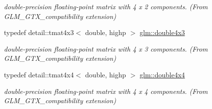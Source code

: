 \begin{CompactItemize}
\begin{CompactList}\small\item\em double-precision floating-point matrix with 4 x 2 components. (From GLM\_\-GTX\_\-compatibility extension) \item\end{CompactList}\item 
\hypertarget{group__gtx__compatibility_g1199ee41226db53d5f190d0628041845}{
typedef detail::tmat4x3$<$ double, highp $>$ \hyperlink{group__gtx__compatibility_g1199ee41226db53d5f190d0628041845}{glm::double4x3}}
\label{group__gtx__compatibility_g1199ee41226db53d5f190d0628041845}

\begin{CompactList}\small\item\em double-precision floating-point matrix with 4 x 3 components. (From GLM\_\-GTX\_\-compatibility extension) \item\end{CompactList}\item 
\hypertarget{group__gtx__compatibility_g95e88bfe8dea34a6d4b30b1029c3e2da}{
typedef detail::tmat4x4$<$ double, highp $>$ \hyperlink{group__gtx__compatibility_g95e88bfe8dea34a6d4b30b1029c3e2da}{glm::double4x4}}
\label{group__gtx__compatibility_g95e88bfe8dea34a6d4b30b1029c3e2da}

\begin{CompactList}\small\item\em double-precision floating-point matrix with 4 x 4 components. (From GLM\_\-GTX\_\-compatibility extension) \item\end{CompactList}\end{CompactItemize}
